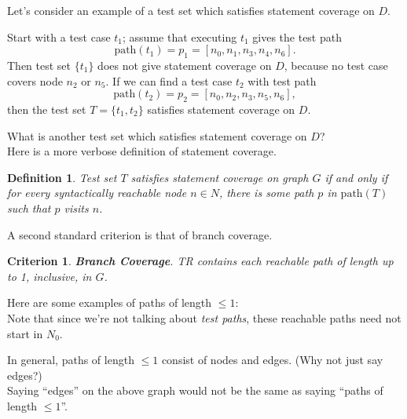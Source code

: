 \documentclass[11pt]{article}
\newtheorem{defn}{Definition}
\newtheorem{crit}{Criterion}
\begin{document}
Let's consider an example of a test set which satisfies statement coverage
on $D$.

Start with a test case $t_1$; assume that executing $t_1$ gives the
test path 
\[ \mbox{path}(t_1) = p_1 = [n_0, n_1, n_3, n_4, n_6].\] 
Then
test set $\{ t_1\}$ does not give statement coverage on $D$, because no
test case covers node $n_2$ or $n_5$. If we can find a test case $t_2$
with test path 
\[\mbox{path}(t_2) = p_2 = [n_0, n_2, n_3, n_5, n_6],\]
then the test set $T = \{ t_1, t_2 \}$ satisfies statement coverage on $D$.

{\sf What is another test set which satisfies statement coverage on $D$?}\\[2em]


Here is a more verbose definition of statement coverage.

\begin{defn}
Test set $T$ satisfies \emph{statement coverage} on graph $G$ if and only
if for every syntactically reachable node $n \in N$, there is some
path $p$ in $\mbox{path}(T)$ such that $p$ visits $n$.
\end{defn}

A second standard criterion is that of branch coverage.
\begin{crit}
{\bf Branch Coverage}. TR contains each reachable path of length up
to 1, inclusive, in $G$.
\end{crit}

{\sf Here are some examples of paths of length $\le 1$:}\\[1em]
Note that since we're not talking about \emph{test paths}, these
reachable paths need not start in $N_0$.

In general, paths of length $\le 1$ consist of nodes and edges. {\sf (Why not just
say edges?)}\\[3em]

Saying ``edges'' on the above graph would not be the same as saying ``paths
of length $\le 1$''.
\end{document}
